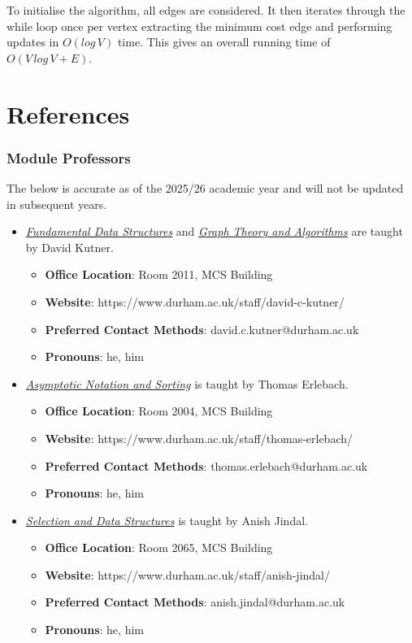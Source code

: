 \documentclass{article}
\begin{document}
\noindent To initialise the algorithm, all edges are considered. It then iterates through the while loop once per vertex extracting the minimum cost edge and performing updates in \(O(log\,V)\) time. This gives an overall running time of \(O(V\,log\,V + E)\).

\newpage\part{References}

\section{Module Professors}

The below is accurate as of the 2025/26 academic year and will not be updated in subsequent years.
\begin{itemize}
    \item \hyperref[part:1.fds]{\textit{Fundamental Data Structures}} and \hyperref[part:4.gta]{\textit{Graph Theory and Algorithms}} are taught by David Kutner.
    \begin{itemize}
        \item \textbf{Office Location}: Room 2011, MCS Building
        \item \textbf{Website}: https://www.durham.ac.uk/staff/david-c-kutner/
        \item \textbf{Preferred Contact Methods}: david.c.kutner@durham.ac.uk
        \item \textbf{Pronouns}: he, him
    \end{itemize}
    
    \item \hyperref[part:2.ans]{\textit{Asymptotic Notation and Sorting}} is taught by Thomas Erlebach.
    \begin{itemize}
        \item \textbf{Office Location}: Room 2004, MCS Building
        \item \textbf{Website}: https://www.durham.ac.uk/staff/thomas-erlebach/
        \item \textbf{Preferred Contact Methods}: thomas.erlebach@durham.ac.uk
        \item \textbf{Pronouns}: he, him
    \end{itemize}
    
    \item \hyperref[part:3.sds]{\textit{Selection and Data Structures}} is taught by Anish Jindal.
    \begin{itemize}
        \item \textbf{Office Location}: Room 2065, MCS Building
        \item \textbf{Website}: https://www.durham.ac.uk/staff/anish-jindal/
        \item \textbf{Preferred Contact Methods}: anish.jindal@durham.ac.uk
        \item \textbf{Pronouns}: he, him
    \end{itemize}
\end{itemize}
\end{document}

